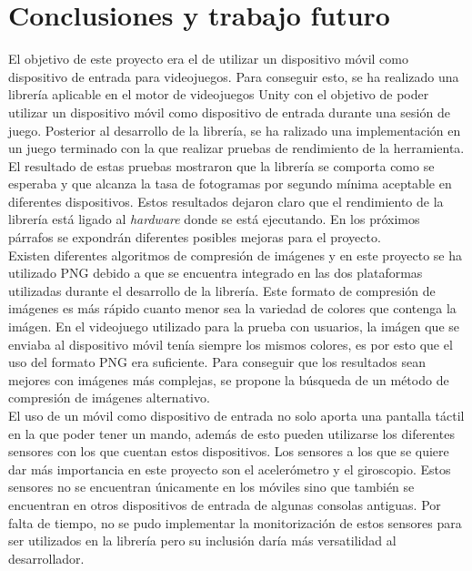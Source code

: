 
\chapter{Conclusiones y trabajo futuro}
\label{cap7}
\label{cap:conclusiones}


El objetivo de este proyecto era el de utilizar un dispositivo m\'ovil como dispositivo de entrada para videojuegos. Para conseguir esto, se ha realizado una librer\'ia aplicable en el motor de videojuegos Unity con el objetivo de poder utilizar un dispositivo m\'ovil como dispositivo de entrada durante una sesi\'on de juego. Posterior al desarrollo de la librer\'ia, se ha ralizado una implementaci\'on en un juego terminado con la que realizar pruebas de rendimiento de la herramienta.\\

El resultado de estas pruebas mostraron que la librer\'ia se comporta como se esperaba y que alcanza la tasa de fotogramas por segundo m\'inima aceptable en diferentes dispositivos. Estos resultados dejaron claro que el rendimiento de la librer\'ia est\'a ligado al \textit{hardware} donde se est\'a ejecutando. En los pr\'oximos p\'arrafos se expondr\'an diferentes posibles mejoras para el proyecto.\\

Existen diferentes algoritmos de compresi\'on de im\'agenes y en este proyecto se ha utilizado PNG debido a que se encuentra integrado en las dos plataformas utilizadas durante el desarrollo de la librer\'ia. Este formato de compresi\'on de im\'agenes es m\'as r\'apido cuanto menor sea la variedad de colores que contenga la im\'agen. En el videojuego utilizado para la prueba con usuarios, la im\'agen que se enviaba al dispositivo m\'ovil ten\'ia siempre los mismos colores, es por esto que el uso del formato PNG era suficiente. Para conseguir que los resultados sean mejores con im\'agenes m\'as complejas, se propone la b\'usqueda de un m\'etodo de compresi\'on de im\'agenes alternativo.\\

El uso de un m\'ovil como dispositivo de entrada no solo aporta una pantalla t\'actil en la que poder tener un mando, adem\'as de esto pueden utilizarse los diferentes sensores con los que cuentan estos dispositivos. Los sensores a los que se quiere dar m\'as importancia en este proyecto son el aceler\'ometro y el giroscopio. Estos sensores no se encuentran \'unicamente en los m\'oviles sino que tambi\'en se encuentran en otros dispositivos de entrada de algunas consolas antiguas. Por falta de tiempo, no se pudo implementar la monitorizaci\'on de estos sensores para ser utilizados en la librer\'ia pero su inclusi\'on dar\'ia m\'as versatilidad al desarrollador.\\

